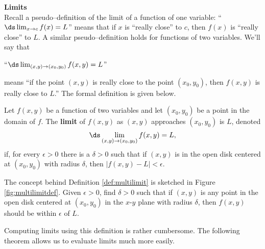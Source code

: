 \noindent\textbf{\large Limits}\\

Recall a pseudo--definition of the limit of a function of one variable: ``$\ds \lim_{x\to c}f(x) = L$'' means that if $x$ is ``really close'' to $c$, then $f(x)$ is ``really close'' to $L$. A similar pseudo--definition holds for functions of two variables. We'll say that 
\enlargethispage{3\baselineskip}

\begin{center}
``$\ds \lim_{(x,y)\to (x_0,y_0)} f(x,y) = L$'' \end{center}
means ``if the point $(x,y)$ is really close to the point $(x_0,y_0)$, then $f(x,y)$ is really close to $L$.'' The formal definition is given below.

{Let $f(x,y)$ be a function of two variables and let $(x_0,y_0)$ be a point in the domain of $f$. The \textbf{limit} of $f(x,y)$ as $(x,y)$ approaches $(x_0,y_0)$ is $L$, denoted $$\ds \lim_{(x,y)\to (x_0,y_0)} f(x,y) = L,$$
if, for every $\epsilon>0$ there is a $\delta>0$ such that if $(x,y)$ is in the open disk centered at $(x_0,y_0)$ with radius $\delta$, then $|f(x,y) - L|<\epsilon.$
}


The concept behind Definition \ref{def:multilimit} is sketched in Figure \ref{fig:multilimitdef}. Given $\epsilon>0$, find $\delta>0$ such that if $(x,y)$ is any point in the open disk centered at $(x_0,y_0)$ in the $x$-$y$ plane with radius $\delta$, then $f(x,y)$ should be within $\epsilon$ of $L$. 

Computing limits using this definition is rather cumbersome. The following theorem allows us to evaluate limits much more easily.



